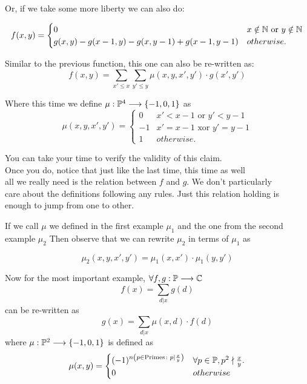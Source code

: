 Or, if we take some more liberty we can also do:

\[
  f(x, y) =
  \begin{cases}
    0 & x \notin \mathbb{N} \text{ or } y \notin \mathbb{N} \\
    g(x, y) - g(x - 1, y) - g(x, y - 1) + g(x - 1, y - 1) & otherwise.
  \end{cases}
\]

Similar to the previous function, this one can also be re-written as:
$$f(x, y) = \sum_{x' \le x}\sum_{y' \le y} \mu(x, y, x', y') \cdot g(x', y')$$

Where this time we define $\mu : \mathbb{P}^4 \longrightarrow \{-1, 0, 1\}$ as
\[
  \mu(x, y, x', y') =
  \begin{cases}
    0 & x' < x - 1 \text{ or } y' < y - 1\\
    -1 & x' = x - 1 \text { xor } y' = y - 1\\
    1 & otherwise.
  \end{cases}
\]

You can take your time to verify the validity of this claim.\\
Once you do, notice that just like the last time, this time as well\\
all we really need is the relation between $f$ and $g$. We don't particularly\\
care about the definitions following any rules. Just this relation holding is\\
enough to jump from one to other.

\begin{tcolorbox}[colframe=red!50, title=Fun tidbit]
  If we call $\mu$ we defined in the first example $\mu_1$ and the
  one from the second example $\mu_2$
  Then observe that we can rewrite $\mu_2$ in terms of $\mu_1$ as

  $$\mu_2(x, y, x', y') = \mu_1(x, x') \cdot \mu_1(y, y')$$
\end{tcolorbox}

Now for the most important example,
$\forall f, g: \mathbb{P} \longrightarrow \mathbb{C}$
$$f(x) = \sum_{d | x} g(d)$$
can be re-written as
$$g(x) = \sum_{d | x} \mu(x, d) \cdot f(d)$$
where $\mu : \mathbb{P}^2 \longrightarrow \{-1, 0, 1\}$
is defined as
\[
  \mu(x, y) =
  \begin{cases}
    (-1)^{n\left(p \in \text{Primes} \colon  p | \frac x y \right)} &
    \forall p \in \mathbb{P}, p^2 \nmid \frac x y.\\
    0 & otherwise
  \end{cases}
\]

